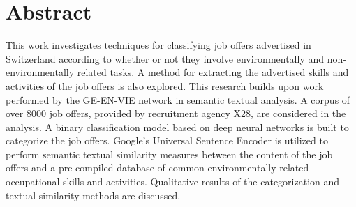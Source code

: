 \chapter*{Abstract}

This work investigates techniques for classifying 
job offers advertised in Switzerland according to whether or not they involve environmentally and non-environmentally related tasks. A method for extracting the advertised skills and activities of the job offers is also explored. This research builds upon work performed by the GE-EN-VIE network in semantic textual analysis.  A corpus of over 8000 job offers, provided by recruitment agency X28, are considered in the analysis. A binary classification model based on deep neural networks is built to categorize the job offers. Google's Universal Sentence Encoder is utilized to perform semantic textual similarity measures between the content of the job offers and a pre-compiled database of common environmentally related occupational skills and activities. Qualitative results of the categorization and textual similarity methods are discussed.  


    
